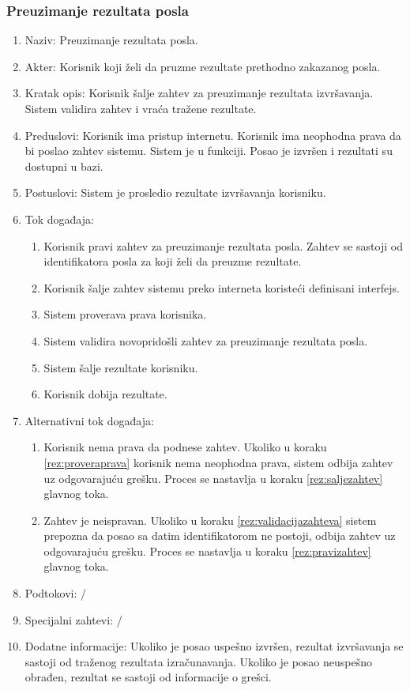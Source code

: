 \documentclass[12pt,oneside]{memoir}
\begin{document}
\subsubsection{Preuzimanje rezultata posla}
\begin{enumerate}
\item Naziv: Preuzimanje rezultata posla.
\item Akter: Korisnik koji želi da pruzme rezultate prethodno zakazanog posla.
\item Kratak opis: Korisnik šalje zahtev za preuzimanje rezultata izvršavanja. Sistem validira zahtev i vraća tražene rezultate.
\item Preduslovi: Korisnik ima pristup internetu. Korisnik ima neophodna prava da bi poslao zahtev sistemu. Sistem je u funkciji. Posao je izvršen i rezultati su dostupni u bazi.
\item Postuslovi: Sistem je prosledio rezultate izvršavanja korisniku.
\item Tok događaja:
	\begin{enumerate}
	\item \label{rez:pravizahtev} Korisnik pravi zahtev za preuzimanje rezultata posla. Zahtev se sastoji od identifikatora posla za koji želi da preuzme rezultate.
	\item \label{rez:saljezahtev} Korisnik šalje zahtev sistemu preko interneta koristeći definisani interfejs.
	\item \label{rez:proveraprava} Sistem proverava prava korisnika.
	\item \label{rez:validacijazahteva} Sistem validira novopridošli zahtev za preuzimanje rezultata posla.
	\item \label{rez:sinhslanjerez} Sistem šalje rezultate korisniku.
	\item Korisnik dobija rezultate.
	\end{enumerate}
\item Alternativni tok događaja:
	\begin{enumerate}
	\item Korisnik nema prava da podnese zahtev. Ukoliko u koraku \ref{rez:proveraprava} korisnik nema neophodna prava, sistem odbija zahtev uz odgovarajuću grešku. Proces se nastavlja u koraku \ref{rez:saljezahtev} glavnog toka.
	\item Zahtev je neispravan. Ukoliko u koraku \ref{rez:validacijazahteva} sistem prepozna da posao sa datim identifikatorom ne postoji, odbija zahtev uz odgovarajuću grešku. Proces se nastavlja u koraku \ref{rez:pravizahtev} glavnog toka.
	\end{enumerate}
\item Podtokovi: /
\item Specijalni zahtevi: /
\item Dodatne informacije: Ukoliko je posao uspešno izvršen, rezultat izvršavanja se sastoji od traženog rezultata izračunavanja. Ukoliko je posao neuspešno obrađen, rezultat se sastoji od informacije o grešci.
\end{enumerate}
\end{document}
